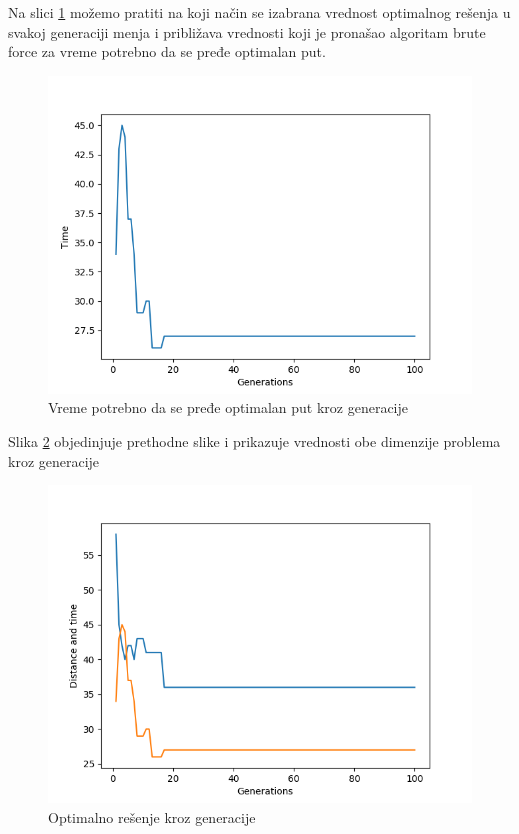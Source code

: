 \documentclass[a4paper]{article}
\begin{document}
Na slici \ref{fig:pande2} možemo pratiti na koji način se izabrana vrednost optimalnog rešenja u svakoj generaciji menja i približava vrednosti koji je pronašao algoritam brute force za vreme potrebno da se pređe optimalan put.
\begin{figure}[h!]
\begin{center}
\includegraphics[scale=0.40]{2.png}
\end{center}
\caption{Vreme potrebno da se pređe optimalan put kroz generacije}
\label{fig:pande2}
\end{figure}
\newpage
Slika \ref{fig:pande3} objedinjuje prethodne slike i prikazuje vrednosti obe dimenzije problema kroz generacije
\begin{figure}[h!]
\begin{center}
\includegraphics[scale=0.60]{3.png}
\end{center}
\caption{Optimalno rešenje kroz generacije}
\label{fig:pande3}
\end{figure}
\end{document}
